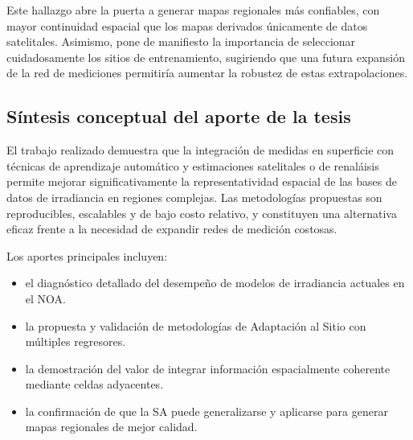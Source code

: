 \documentclass[letterpaper,12pt, twoside]{report}
\providecommand{\DIFdeltex}[1]{{\protect\color{red} \scriptsize #1}} %
\providecommand{\DIFdel}[1]{\texorpdfstring{\DIFdeltex{#1}}{}} %
\begin{document}
\DIFdel{Este hallazgo abre la puerta a generar mapas regionales más confiables, con mayor continuidad espacial que los mapas derivados únicamente de datos satelitales. Asimismo, pone de manifiesto la importancia de seleccionar cuidadosamente los sitios de entrenamiento, sugiriendo que una futura expansión de la red de mediciones permitiría aumentar la robustez de estas extrapolaciones.
}%

\subsection{\DIFdel{Síntesis conceptual del aporte de la tesis}}
\addtocounter{subsection}{-1}%

\DIFdel{El trabajo realizado demuestra que la integración de medidas en superficie con técnicas de aprendizaje automático y estimaciones satelitales o de renaláisis permite mejorar significativamente la representatividad espacial de las bases de datos de irradiancia en regiones complejas. Las metodologías propuestas son reproducibles, escalables y de bajo costo relativo, y constituyen una alternativa eficaz frente a la necesidad de expandir redes de medición costosas.
}%

\DIFdel{Los aportes principales incluyen:
}%

\begin{itemize}%
\item%
\DIFdel{el diagnóstico detallado del desempeño de modelos de irradiancia actuales en el NOA.
}%
\item%
\DIFdel{la propuesta y validación de metodologías de Adaptación al Sitio con múltiples regresores.
}%
\item%
\DIFdel{la demostración del valor de integrar información espacialmente coherente mediante celdas adyacentes.
}%
\item%
\DIFdel{la confirmación de que la SA puede generalizarse y aplicarse para generar mapas regionales de mejor calidad.
}
\end{itemize}%
\end{document}
